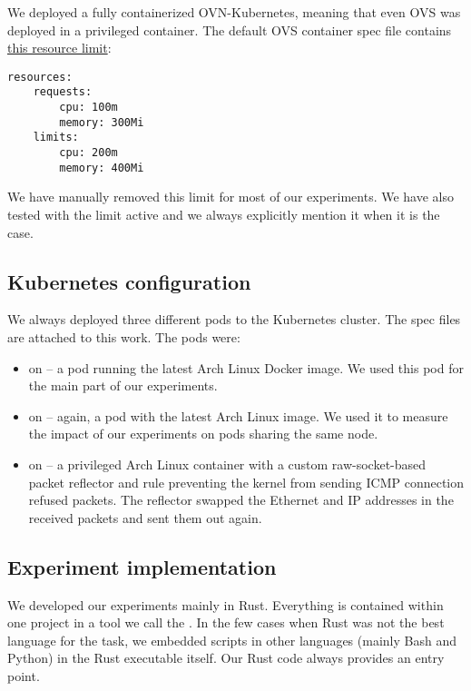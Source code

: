 We deployed a fully containerized OVN-Kubernetes, meaning that even OVS was deployed in a privileged container. The default OVS container spec file contains \href{https://github.com/ovn-org/ovn-kubernetes/blob/master/dist/templates/ovs-node.yaml.j2\#L84-L90}{this resource limit}:

\begin{verbatim}
resources:
    requests:
        cpu: 100m
        memory: 300Mi
    limits:
        cpu: 200m
        memory: 400Mi
\end{verbatim}

We have manually removed this limit for most of our experiments. We have also tested with the limit active and we always explicitly mention it when it is the case.

\subsection{Kubernetes configuration}

We always deployed three different pods to the Kubernetes cluster. The spec files are attached to this work. The pods were:

\begin{itemize}
    \item {} on  -- a pod running the latest Arch Linux Docker image. We used this pod for the main part of our experiments.

    \item {} on  -- again, a pod with the latest Arch Linux image. We used it to measure the impact of our experiments on pods sharing the same node.

    \item {} on  -- a privileged Arch Linux container with a custom raw-socket-based packet reflector and  rule preventing the kernel from sending ICMP connection refused packets. The reflector swapped the Ethernet and IP addresses in the received packets and sent them out again.
\end{itemize}

\subsection{Experiment implementation}

We developed our experiments mainly in Rust. Everything is contained within one project in a tool we call the . In the few cases when Rust was not the best language for the task, we embedded scripts in other languages (mainly Bash and Python) in the Rust executable itself. Our Rust code always provides an entry point.

